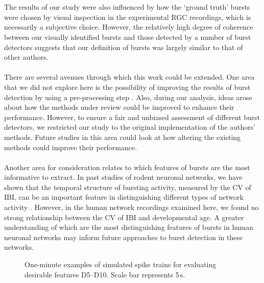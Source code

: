 \documentclass[12pt, titlepage]{article}
\begin{document}
	\\ \\The results of our study were also influenced by how the `ground truth' bursts were chosen by visual inspection in the experimental RGC recordings, which is necessarily a subjective choice. However, the relatively high degree of coherence between our visually identified bursts and those detected by a number of burst detectors suggests that our definition of bursts was largely similar to that of other authors.
	\\ \\There are several avenues through which this work could be extended. One area that we did not explore here is the possibility of improving the results of burst detection by using a pre-processing step \cite{Martens2014}. Also, during our analysis, ideas arose about how the methods under review could be improved to enhance their performance. However, to ensure a fair and unbiased assessment of different burst detectors, we restricted our study to the original implementation of the authors' methods. Future studies in this area could look at how altering the existing methods could improve their performance. 
	\\ \\ Another area for consideration relates to which features of bursts are the most informative to extract. In past studies of rodent neuronal networks, we have shown that the temporal structure of bursting activity, measured by the CV of IBI, can be an important feature in distinguishing different types of network activity \cite{Charlesworth2015}. However, in the human network recordings examined here, we found no strong relationship between the CV of IBI and developmental age. A greater understanding of which are the most distinguishing features of bursts in human neuronal networks may inform future approaches to burst detection in these networks. 
	\pagebreak \\
		\begin{figure}[h]
			\centering
			\caption{One-minute examples of simulated spike trains for evaluating desirable features D5--D10. Scale bar represents 5$\,$s.}
			\label{sim_egs}
		\end{figure}
\end{document}
